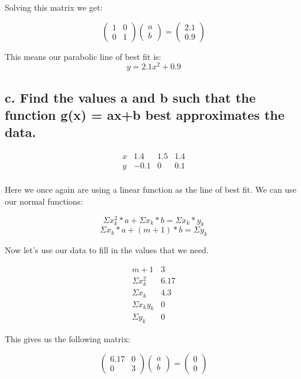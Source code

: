 \documentclass[]{article}
\begin{document}
Solving this matrix we get:

\[
\left(\begin{array}{cc} 
1 & 0\\
0 & 1
\end{array}\right)
\left(\begin{array}{c} 
a \\
b 
\end{array}\right) =
\left(\begin{array}{c}
2.1 \\
0.9 
\end{array}\right)
\]

This means our parabolic line of best fit is: \[y = 2.1x^2 + 0.9\]

\subsection{c. Find the values a and b such that the function g(x) =
ax+b best approximates the
data.}\label{c.-find-the-values-a-and-b-such-that-the-function-gx-axb-best-approximates-the-data.}

\[
\begin{array}{c|c|c|c|} 
x & 1.4 & 1.5 & 1.4\\
y & -0.1 & 0 & 0.1\\
\end{array}
\]

Here we once again are using a linear function as the line of best fit.
We can use our normal functions:

\[\Sigma x_k^2*a + \Sigma x_k * b = \Sigma x_k * y_k\]
\[\Sigma x_k * a + (m + 1)*b = \Sigma y_k\]

Now let's use our data to fill in the values that we need.

\[
\begin{array}{c|c|} 
m+1 & 3\\
\Sigma x_k^2 & 6.17\\
\Sigma x_k & 4.3\\
\Sigma x_ky_k & 0\\
\Sigma y_k & 0
\end{array}
\]

This gives us the following matrix:

\[
\left(\begin{array}{cc} 
6.17 & 0\\
0 & 3
\end{array}\right)
\left(\begin{array}{c} 
a \\
b 
\end{array}\right) =
\left(\begin{array}{c}
0 \\
0 
\end{array}\right)
\]
\end{document}
